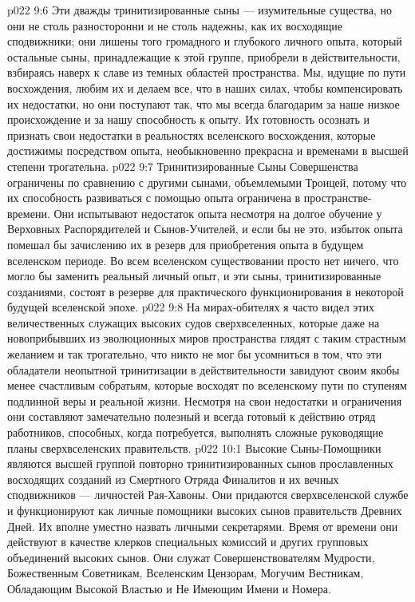 \vs p022 9:6 Эти дважды тринитизированные сыны --- изумительные существа, но они не столь разносторонни и не столь надежны, как их восходящие сподвижники; они лишены того громадного и глубокого личного опыта, который остальные сыны, принадлежащие к этой группе, приобрели в действительности, взбираясь наверх к славе из темных областей пространства. Мы, идущие по пути восхождения, любим их и делаем все, что в наших силах, чтобы компенсировать их недостатки, но они поступают так, что мы всегда благодарим за наше низкое происхождение и за нашу способность к опыту. Их готовность осознать и признать свои недостатки в реальностях вселенского восхождения, которые достижимы посредством опыта, необыкновенно прекрасна и временами в высшей степени трогательна.
\vs p022 9:7 Тринитизированные Сыны Совершенства ограничены по сравнению с другими сынами, объемлемыми Троицей, потому что их способность развиваться с помощью опыта ограничена в пространстве\hyp{}времени. Они испытывают недостаток опыта несмотря на долгое обучение у Верховных Распорядителей и Сынов\hyp{}Учителей, и если бы не это, избыток опыта помешал бы зачислению их в резерв для приобретения опыта в будущем вселенском периоде. Во всем вселенском существовании просто нет ничего, что могло бы заменить реальный личный опыт, и эти сыны, тринитизированные созданиями, состоят в резерве для практического функционирования в некоторой будущей вселенской эпохе.
\vs p022 9:8 На мирах\hyp{}обителях я часто видел этих величественных служащих высоких судов сверхвселенных, которые даже на новоприбывших из эволюционных миров пространства глядят с таким страстным желанием и так трогательно, что никто не мог бы усомниться в том, что эти обладатели неопытной тринитизации в действительности завидуют своим якобы менее счастливым собратьям, которые восходят по вселенскому пути по ступеням подлинной веры и реальной жизни. Несмотря на свои недостатки и ограничения они составляют замечательно полезный и всегда готовый к действию отряд работников, способных, когда потребуется, выполнять сложные руководящие планы сверхвселенских правительств.
\vs p022 10:1 Высокие Сыны\hyp{}Помощники являются высшей группой повторно тринитизированных сынов прославленных восходящих созданий из Смертного Отряда Финалитов и их вечных сподвижников --- личностей Рая\hyp{}Хавоны. Они придаются сверхвселенской службе и функционируют как личные помощники высоких сынов правительств Древних Дней. Их вполне уместно назвать личными секретарями. Время от времени они действуют в качестве клерков специальных комиссий и других групповых объединений высоких сынов. Они служат Совершенствователям Мудрости, Божественным Советникам, Вселенским Цензорам, Могучим Вестникам, Обладающим Высокой Властью и Не Имеющим Имени и Номера.
